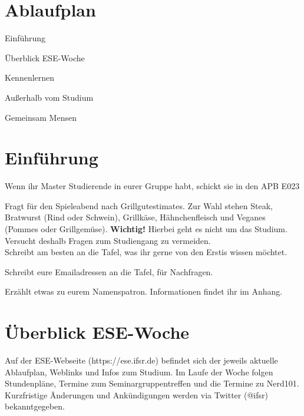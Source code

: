\documentclass[a4paper,12pt]{report}
\begin{document}
\section{Ablaufplan}
\begin{itemize*}
	\item Einführung
	\item Überblick ESE-Woche
	\item Kennenlernen
	\item Außerhalb vom Studium
	\item Gemeinsam Mensen
\end{itemize*}

\section{Einführung}
\begin{itemize*}
	\item Wenn ihr Master Studierende in eurer Gruppe habt, schickt sie in den APB E023
	\item Fragt für den Spieleabend nach Grillgutestimates. Zur Wahl stehen Steak, Bratwurst (Rind oder Schwein), Grillkäse, Hähnchenfleisch und Veganes (Pommes oder Grillgemüse). 
	\textbf{Wichtig!} Hierbei geht es nicht um das Studium. Versucht deshalb Fragen zum Studiengang zu vermeiden.\\
	Schreibt am besten an die Tafel, was ihr gerne von den Erstis wissen möchtet.
	\item Schreibt eure Emailadressen an die Tafel, für Nachfragen.
	\item Erzählt etwas zu eurem Namenspatron. Informationen findet ihr im Anhang.
\end{itemize*}

\section{Überblick ESE-Woche}

\begin{framed}
Auf der ESE-Webseite (https://ese.ifsr.de) befindet sich der jeweils aktuelle Ablaufplan, Weblinks und Infos zum Studium. Im Laufe der Woche folgen Stundenpläne, Termine zum Seminargruppentreffen und die Termine zu Nerd101. Kurzfristige Änderungen und Ankündigungen werden via Twitter (@ifsr) bekanntgegeben.
\end{framed}
\end{document}

